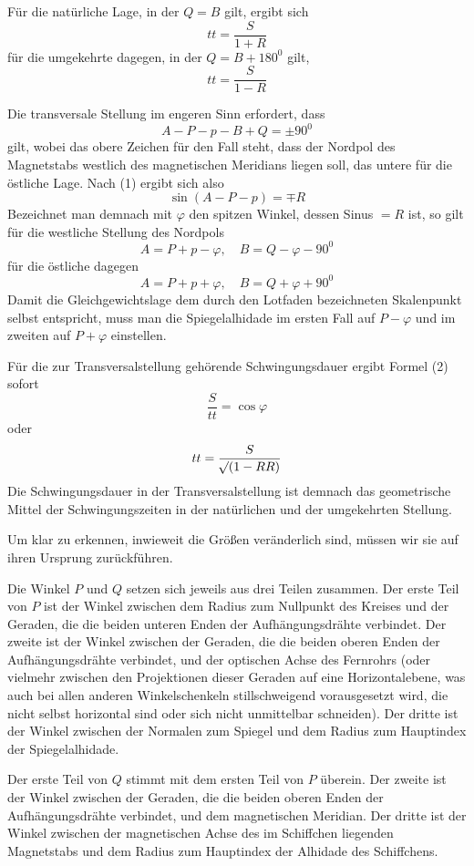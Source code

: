 Für die natürliche Lage, in der $Q=B$ gilt, ergibt sich
\[
tt=\frac{S}{1+R}
\]
für die umgekehrte dagegen, in der $Q=B+180^0$ gilt,
\[
tt=\frac{S}{1-R}
\]

Die transversale Stellung im engeren Sinn erfordert, dass
\[
A-P-p-B+Q=\pm90^0
\]
gilt, wobei das obere Zeichen für den Fall steht, dass der Nordpol des Magnetstabs westlich des magnetischen Meridians liegen soll, das untere für die östliche Lage. Nach (1) ergibt sich also
\[
\sin(A-P-p)=\mp R
\]
Bezeichnet man demnach mit $\varphi$ den spitzen Winkel, dessen Sinus $=R$ ist, so gilt für die westliche Stellung des Nordpols
\[
A=P+p-\varphi,\quad B=Q-\varphi-90^0
\]
für die östliche dagegen
\[
A=P+p+\varphi,\quad B=Q+\varphi+90^0
\]
Damit die Gleichgewichtslage dem durch den Lotfaden bezeichneten Skalenpunkt selbst entspricht, muss man die Spiegelalhidade im ersten Fall auf $P-\varphi$ und im zweiten auf $P+\varphi$ einstellen.

Für die zur Transversalstellung gehörende Schwingungsdauer ergibt Formel (2) sofort
\[
\frac{S}{tt}=\cos\varphi
\]
oder
\[
tt=\frac{S}{\mathord{{}^{}\!\surd}(1-RR)}
\]
Die Schwingungsdauer in der Transversalstellung ist demnach das geometrische Mittel der Schwingungszeiten in der natürlichen und der umgekehrten Stellung.

Um klar zu erkennen, inwieweit die Größen veränderlich sind, müssen wir sie auf ihren Ursprung zurückführen.

Die Winkel $P$ und $Q$ setzen sich jeweils aus drei Teilen zusammen. Der erste Teil von $P$ ist der Winkel zwischen dem Radius zum Nullpunkt des Kreises und der Geraden, die die beiden unteren Enden der Aufhängungsdrähte verbindet. Der zweite ist der Winkel zwischen der Geraden, die die beiden oberen Enden der Aufhängungsdrähte verbindet, und der optischen Achse des Fernrohrs (oder vielmehr zwischen den Projektionen dieser Geraden auf eine Horizontalebene, was auch bei allen anderen Winkelschenkeln stillschweigend vorausgesetzt wird, die nicht selbst horizontal sind oder sich nicht unmittelbar schneiden). Der dritte ist der Winkel zwischen der Normalen zum Spiegel und dem Radius zum Hauptindex der Spiegelalhidade.

Der erste Teil von $Q$ stimmt mit dem ersten Teil von $P$ überein. Der zweite ist der Winkel zwischen der Geraden, die die beiden oberen Enden der Aufhängungsdrähte verbindet, und dem magnetischen Meridian. Der dritte ist der Winkel zwischen der magnetischen Achse des im Schiffchen liegenden Magnetstabs und dem Radius zum Hauptindex der Alhidade des Schiffchens.

